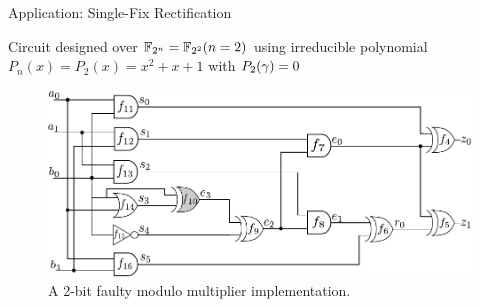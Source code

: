 

\begin{frame}{\large Application: Single-Fix Rectification}
\bi
	\item Circuit designed over ${\mathbb{F}}_{2^n} = {\mathbb{F}}_{2^2} (n=2)$ using irreducible polynomial $P_n(x) = P_2(x) = x^2+x+1$ with $P_2(\gamma)=0$
\ei
\begin{figure}[hbt]
    \begin{center}
    \includegraphics[scale = 0.64]{mas_red_bug-eps-converted-to.pdf}
    \end{center}
    \caption*{\small A 2-bit faulty modulo
      multiplier implementation. 
    }
    \label{fig:mas_both}
\end{figure}

\end{frame}

